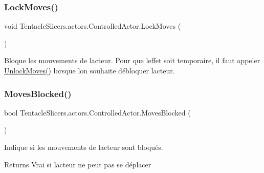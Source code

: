 \subsubsection{\texorpdfstring{Lock\+Moves()}{LockMoves()}}
{\footnotesize\ttfamily void Tentacle\+Slicers.\+actors.\+Controlled\+Actor.\+Lock\+Moves (\begin{DoxyParamCaption}{ }\end{DoxyParamCaption})}



Bloque les mouvements de l\textquotesingle{}acteur. Pour que l\textquotesingle{}effet soit temporaire, il faut appeler \hyperlink{class_tentacle_slicers_1_1actors_1_1_controlled_actor_a14547b4a4eff36c7d604d102b1ab30e3}{Unlock\+Moves()} lorsque l\textquotesingle{}on souhaite débloquer l\textquotesingle{}acteur. 

\mbox{\label{class_tentacle_slicers_1_1actors_1_1_controlled_actor_a024f5552c29ca8f5c59c1c14ce7e759d}} 
\subsubsection{\texorpdfstring{Moves\+Blocked()}{MovesBlocked()}}
{\footnotesize\ttfamily bool Tentacle\+Slicers.\+actors.\+Controlled\+Actor.\+Moves\+Blocked (\begin{DoxyParamCaption}{ }\end{DoxyParamCaption})}



Indique si les mouvements de l\textquotesingle{}acteur sont bloqués. 

\begin{DoxyReturn}{Returns}
Vrai si l\textquotesingle{}acteur ne peut pas se déplacer 
\end{DoxyReturn}
\mbox{\label{class_tentacle_slicers_1_1actors_1_1_controlled_actor_aa66cbbda81610ee2610e540e59725a39}} 
